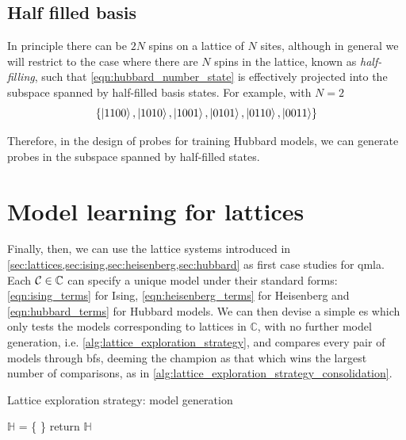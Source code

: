 \subsection{Half filled basis}
In principle there can be $2N$ spins on a lattice of $N$ sites, 
    although in general we will restrict to the case where there are $N$ spins in the lattice, 
    known as \emph{half-filling}, such that \cref{eqn:hubbard_number_state} is effectively projected into the subspace 
    spanned by half-filled basis states. 
For example, with $N=2$
\begin{equation}
    \label{eqn:hubbard_half_filled_basis_states}
    \{
        \ket{ 1100 }, \ket{ 1010 }, \ket{ 1001 }, 
        \ket{ 0101 }, \ket{ 0110 }, \ket{ 0011 }
    \}
\end{equation}

Therefore, in the design of probes for training Hubbard models, 
    we can generate probes in the subspace spanned by half-filled states. 

\section{Model learning for lattices}
Finally, then, we can use the lattice systems introduced in \cref{sec:lattices,sec:ising,sec:heisenberg,sec:hubbard}
    as first case studies for \gls{qmla}. 
Each ${ \mathcal{C}} \in \mathbb{C}$ can specify a unique model under their standard forms:
    \cref{eqn:ising_terms} for Ising, \cref{eqn:heisenberg_terms} for Heisenberg 
    and \cref{eqn:hubbard_terms} for Hubbard models.     
We can then devise a simple \gls{es} which only tests the models corresponding to lattices in $\mathbb{C}$, 
    with no further model generation, i.e. \cref{alg:lattice_exploration_strategy}, 
    and compares every pair of models through \glspl{bf}, 
    deeming the champion as that which wins the largest number of comparisons, 
    as in \cref{alg:lattice_exploration_strategy_consolidation}.

\begin{algorithm}
    \caption{Lattice exploration strategy: model generation}
    \label{alg:lattice_exploration_strategy}
    \DontPrintSemicolon

    \;

    $\mathbb{H}$ = \{ \}\;
    return $\mathbb{H}$
\end{algorithm}

